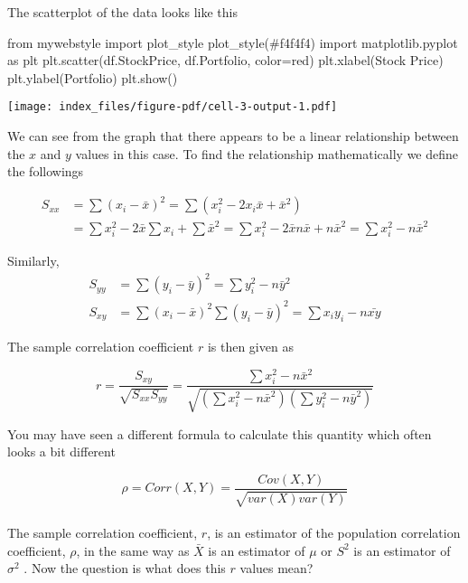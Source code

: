\documentclass[
  letterpaper,
  DIV=11,
  numbers=noendperiod]{scrartcl}
\newenvironment{Shaded}{\begin{snugshade}}{\end{snugshade}}
\newcommand{\ImportTok}[1]{\textcolor[rgb]{0.00,0.46,0.62}{#1}}
\newcommand{\NormalTok}[1]{\textcolor[rgb]{0.00,0.23,0.31}{#1}}
\newcommand{\OperatorTok}[1]{\textcolor[rgb]{0.37,0.37,0.37}{#1}}
\newcommand{\StringTok}[1]{\textcolor[rgb]{0.13,0.47,0.30}{#1}}
\begin{document}
The scatterplot of the data looks like this

\begin{Shaded}
\begin{Highlighting}[]
\ImportTok{from}\NormalTok{ mywebstyle }\ImportTok{import}\NormalTok{ plot\_style}
\NormalTok{plot\_style(}\StringTok{\textquotesingle{}\#f4f4f4\textquotesingle{}}\NormalTok{)}
\ImportTok{import}\NormalTok{ matplotlib.pyplot }\ImportTok{as}\NormalTok{ plt}
\NormalTok{plt.scatter(df.StockPrice, df.Portfolio, color}\OperatorTok{=}\StringTok{\textquotesingle{}red\textquotesingle{}}\NormalTok{)}
\NormalTok{plt.xlabel(}\StringTok{\textquotesingle{}Stock Price\textquotesingle{}}\NormalTok{)}
\NormalTok{plt.ylabel(}\StringTok{\textquotesingle{}Portfolio\textquotesingle{}}\NormalTok{)}
\NormalTok{plt.show()}
\end{Highlighting}
\end{Shaded}

\begin{center}
\texttt{[image: index\_files/figure-pdf/cell-3-output-1.pdf]}
\end{center}

We can see from the graph that there appears to be a linear relationship
between the \(x\) and \(y\) values in this case. To find the
relationship mathematically we define the followings

\begin{align*}
S_{xx}& = \sum (x_i-\bar{x})^2 = \sum (x_i^2-2x_i\bar{x}+\bar{x}^2)\\
& = \sum x_i^2 - 2\bar{x}\sum x_i + \sum \bar{x}^2= \sum x_i^2 - 2\bar{x} n \bar{x} + n \bar{x}^2 = \sum x_i ^2 - n \bar{x}^2
\end{align*}

Similarly, \begin{align*}
S_{yy}& = \sum (y_i-\bar{y})^2=\sum y_i ^2 - n \bar{y}^2\\
S_{xy} & = \sum (x_i-\bar{x})^2 \sum (y_i-\bar{y})^2 = \sum x_iy_i -n \bar{xy}
\end{align*}

The sample correlation coefficient \(r\) is then given as

\[
r = \frac{S_{xy}}{\sqrt{S_{xx}S_{yy}}} = \frac{\sum x_i ^2 - n \bar{x}^2}{\sqrt{\left(\sum x_i ^2 - n \bar{x}^2\right)\left(\sum y_i ^2 - n \bar{y}^2\right)}}
\]

You may have seen a different formula to calculate this quantity which
often looks a bit different

\[
\rho = Corr(X,Y)=\frac{Cov(X,Y)}{\sqrt{var(X)var(Y)}}
\]\\
The sample correlation coefficient, \(r\), is an estimator of the
population correlation coefficient, \(\rho\), in the same way as
\(\bar{X}\) is an estimator of \(\mu\) or \(S^2\) is an estimator of
\(\sigma^2\) . Now the question is what does this \(r\) values mean?
\end{document}
